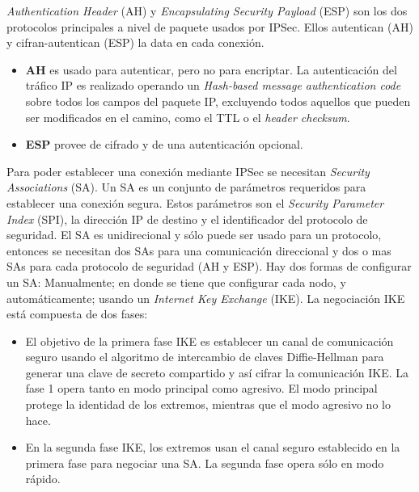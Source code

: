 \documentclass[a4paper,12pt]{article}
\begin{document}
\textit{Authentication Header} (AH) y \textit{Encapsulating Security Payload} (ESP) son los dos protocolos principales a nivel de paquete usados por IPSec.
Ellos autentican (AH) y cifran-autentican (ESP) la data en cada conexión.
\begin{itemize}
 \item \textbf{AH} es usado para autenticar, pero no para encriptar. La autenticación del tráfico IP es realizado operando un \textit{Hash-based message authentication code} sobre todos los campos del paquete IP, excluyendo todos aquellos que pueden ser modificados en el camino, como el TTL o el \textit{header checksum}.
 \item \textbf{ESP} provee de cifrado y de una autenticación opcional.
\end{itemize}

Para poder establecer una conexión mediante IPSec se necesitan \textit{Security Associations} (SA). Un SA es un conjunto de parámetros requeridos para establecer una conexión segura.
Estos parámetros son el \textit{Security Parameter Index} (SPI), la dirección IP de destino y el identificador del protocolo de seguridad. El SA es unidirecional y sólo puede ser usado para un protocolo, entonces se necesitan dos
SAs para una comunicación direccional y dos o mas SAs para cada protocolo de seguridad (AH y ESP).
Hay dos formas de configurar un SA: Manualmente; en donde se tiene que configurar cada nodo, y automáticamente; usando un \textit{Internet Key Exchange} (IKE).
La negociación IKE está compuesta de dos fases:
\begin{itemize}
 \item El objetivo de la primera fase IKE es establecer un canal de comunicación seguro usando el algoritmo de intercambio de claves Diffie-Hellman para generar una clave de secreto compartido y así cifrar la comunicación IKE.
 La fase 1 opera tanto en modo principal como agresivo. El modo principal protege la identidad de los extremos, mientras que el modo agresivo no lo hace.
 \item En la segunda fase IKE, los extremos usan el canal seguro establecido en la primera fase para negociar una SA. La segunda fase opera sólo en modo rápido.
\end{itemize}
\end{document}
